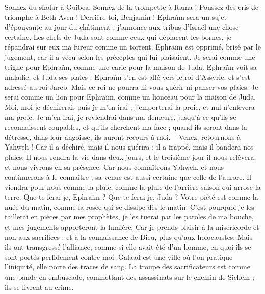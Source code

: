 \begin{multicols}{2}
Sonnez du shofar à Guibea. Sonnez de la trompette à Rama ! Poussez des cris de triomphe à Beth-Aven ! Derrière toi, Benjamin !
Ephraïm sera un sujet d’épouvante au jour du châtiment ; j’annonce aux tribus d'Israël une chose certaine.
Les chefs de Juda sont comme ceux qui déplacent les bornes, je répandrai sur eux ma fureur comme un torrent.
Ephraïm est opprimé, brisé par le jugement, car il a vécu selon les préceptes qui lui plaisaient.
Je serai comme une teigne pour Ephraïm, comme une carie pour la maison de Juda.
Ephraïm voit sa maladie, et Juda ses plaies ; Ephraïm s'en est allé vers le roi d'Assyrie, et s’est adressé au roi Jareb. Mais ce roi ne pourra ni vous guérir ni panser vos plaies.
Je serai comme un lion pour Ephraïm, comme un lionceau pour la maison de Juda. Moi, moi je déchirerai, puis je m'en irai ; j'emporterai la proie, et nul n’enlèvera ma proie.
Je m'en irai, je reviendrai dans ma demeure, jusqu'à ce qu'ils se reconnaissent coupables, et qu'ils cherchent ma face ; quand ils seront dans la détresse, dans leur angoisse, ils auront recours à moi.
\
\VerseOne{}Venez, retournons à Yahweh ! Car il a déchiré, mais il nous guérira ; il a frappé, mais il bandera nos plaies.
\VS{2}Il nous rendra la vie dans deux jours, et le troisième jour il nous relèvera, et nous vivrons en sa présence.
\VS{3}Car nous connaîtrons Yahweh, et nous continuerons à le connaître ; sa venue est aussi certaine que celle de l’aurore. Il viendra pour nous comme la pluie, comme la pluie de l’arrière-saison qui arrose la terre.
\TextTitle{[Yahweh dénonce le péché d'Ephraïm]}
Que te ferai-je, Ephraïm ? Que te ferai-je, Juda ? Votre piété est comme la nuée du matin, comme la rosée qui se dissipe dès le matin.
\VS{5}C'est pourquoi je les taillerai en pièces par mes prophètes, je les tuerai par les paroles de ma bouche, et mes jugements apporteront la lumière.
\VS{6}Car je prends plaisir à la miséricorde et non aux sacrifices ; et à la connaissance de Dieu, plus qu’aux holocaustes.
\VS{7}Mais ils ont transgressé l’alliance, comme si elle avait été d’un homme, en quoi ils se sont portés perfidement contre moi.
\VS{8}Galaad est une ville où l’on pratique l’iniquité, elle porte des traces de sang.
\VS{9}La troupe des sacrificateurs est comme une bande en embuscade, commettant des assassinats sur le chemin de Sichem ; ils se livrent au crime.

\end{multicols}
